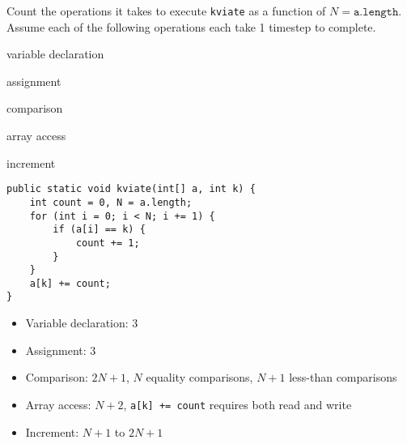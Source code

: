 \begin{blocksection}
\question Count the operations it takes to execute \lstinline$kviate$ as a
function of $N = \texttt{a.length}$. Assume each of the following operations
each take 1 timestep to complete.

\begin{inparaitem}[$\cdot$]
\item variable declaration
\item assignment
\item comparison
\item array access
\item increment
\end{inparaitem}

\begin{lstlisting}
public static void kviate(int[] a, int k) {
    int count = 0, N = a.length;
    for (int i = 0; i < N; i += 1) {
        if (a[i] == k) {
            count += 1;
        }
    }
    a[k] += count;
}
\end{lstlisting}

\begin{solution}[1.5in]
\begin{itemize}
\item Variable declaration: $3$
\item Assignment: $3$
\item Comparison: $2N + 1$, $N$ equality comparisons, $N + 1$ less-than comparisons
\item Array access: $N + 2$, \lstinline$a[k] += count$ requires both read and write
\item Increment: $N + 1$ to $2N + 1$
\end{itemize}
\end{solution}
\end{blocksection}
